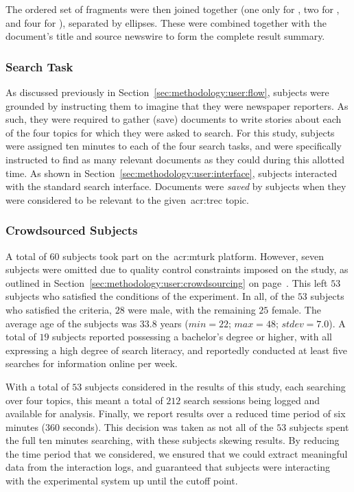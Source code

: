 The ordered set of fragments were then joined together (one only for , two for , and four for ), separated by ellipses. These were combined together with the document's title and source newswire to form the complete result summary.

\subsubsection{Search Task}
As discussed previously in Section~\ref{sec:methodology:user:flow}, subjects were grounded by instructing them to imagine that they were newspaper reporters. As such, they were required to gather (save) documents to write stories about each of the four topics for which they were asked to search. For this study, subjects were assigned ten minutes to each of the four search tasks, and were specifically instructed to find as many relevant documents as they could during this allotted time. As shown in Section~\ref{sec:methodology:user:interface}, subjects interacted with the standard search interface. Documents were \emph{saved} by subjects when they were considered to be relevant to the given~\gls{acr:trec} topic.

\subsubsection{Crowdsourced Subjects}\label{sec:snippets:method:subjects}
A total of $60$ subjects took part on the~\gls{acr:mturk} platform. However, seven subjects were omitted due to quality control constraints imposed on the study, as outlined in Section~\ref{sec:methodology:user:crowdsourcing} on page~\pageref{sec:methodology:user:crowdsourcing}. This left $53$ subjects who satisfied the conditions of the experiment. In all, of the $53$ subjects who satisfied the criteria, $28$ were male, with the remaining $25$ female. The average age of the subjects was $33.8$ years ($min=22$; $max=48$; $stdev=7.0$). A total of $19$ subjects reported possessing a bachelor's degree or higher, with all expressing a high degree of search literacy, and reportedly conducted at least five searches for information online per week.

With a total of $53$ subjects considered in the results of this study, each searching over four topics, this meant a total of $212$ search sessions being logged and available for analysis. Finally, we report results over a reduced time period of six minutes ($360$ seconds). This decision was taken as not all of the $53$ subjects spent the full ten minutes searching, with these subjects skewing results. By reducing the time period that we considered, we ensured that we could extract meaningful data from the interaction logs, and guaranteed that subjects were interacting with the experimental system up until the cutoff point.

